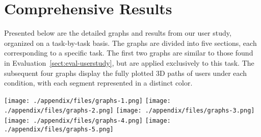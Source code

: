 \section{Comprehensive Results}
Presented below are the detailed graphs and results from our user study, organized on a task-by-task basis. The graphs are divided into five sections, each corresponding to a specific task. The first two graphs are similar to those found in Evaluation~\ref{sect:eval-userstudy}, but are applied exclusively to this task. The subsequent four graphs display the fully plotted 3D paths of users under each condition, with each segment represented in a distinct color.

\newpage
\texttt{[image: ./appendix/files/graphs-1.png]}
\newpage
\texttt{[image: ./appendix/files/graphs-2.png]}
\newpage
\texttt{[image: ./appendix/files/graphs-3.png]}
\newpage
\texttt{[image: ./appendix/files/graphs-4.png]}
\newpage
\texttt{[image: ./appendix/files/graphs-5.png]}
